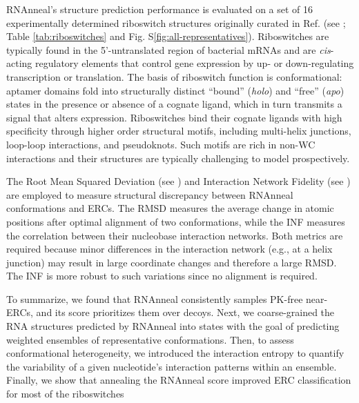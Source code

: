 \documentclass[%
aip,
 amsmath,amssymb,
reprint,%
twocolumn,
]{revtex4-1}
\begin{document}
{RNAnneal's structure prediction performance is evaluated on a set of 16 experimentally determined riboswitch structures originally curated in Ref.\cite{townshend2021geometric} (see ; Table \ref{tab:riboswitches} and Fig. S\ref{fig:all-representatives}). Riboswitches are typically found in the 5'-untranslated region of bacterial mRNAs and are {\it cis}-acting regulatory elements that control gene expression by up- or down-regulating transcription or translation.\cite{huang2025some} The basis of riboswitch function is conformational: aptamer domains fold into structurally distinct ``bound'' ({\it holo}) and ``free'' ({\it apo}) states in the presence or absence of a cognate ligand, which in turn transmits a signal that alters expression. Riboswitches bind their cognate ligands with high specificity through higher order structural motifs, including multi-helix junctions, loop-loop interactions, and pseudoknots. Such motifs are rich in non-WC interactions and their structures are typically challenging to model prospectively.\cite{das2023assessment,bu2025rna,kretsch2025assessment}

The Root Mean Squared Deviation (see ) and Interaction Network Fidelity (see ) are employed to measure structural discrepancy between RNAnneal conformations and ERCs. The RMSD measures the average change in atomic positions after optimal alignment of two conformations, while the INF measures the correlation between their nucleobase interaction networks. Both metrics are required because minor differences in the interaction network (e.g., at a helix junction) may result in large coordinate changes and therefore a large RMSD. The INF is more robust to such variations since no alignment is required.

To summarize, we found that RNAnneal consistently samples PK-free near-ERCs, and its score prioritizes them over decoys. Next, we coarse-grained the RNA structures predicted by RNAnneal into states with the goal of predicting weighted ensembles of representative conformations. Then, to assess conformational heterogeneity, we introduced the interaction entropy to quantify the variability of a given nucleotide's interaction patterns within an ensemble. Finally, we show that annealing the RNAnneal score improved ERC classification for most of the riboswitches



}
\end{document}
